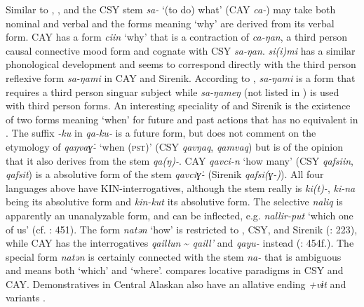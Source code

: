 Similar to , , and  the CSY stem \textit{sa-} ‘(to do) what’ (CAY \textit{ca-}) may take both nominal and verbal  and the forms meaning ‘why’ are derived from its verbal form. CAY has a form \textit{ciin} ‘why’ that is a contraction of \textit{ca-ŋan}, a third person  causal connective mood form and cognate with CSY \textit{sa-ŋan}.   \textit{si(i)mi} has a similar phonological development and seems to correspond directly with the third person reflexive form \textit{sa-ŋami} in CAY and Sirenik. According to \citet{Jacobson2001}, \textit{sa-ŋami} is a form that requires a third person singuar subject while \textit{sa-ŋameŋ} (not listed in ) is used with third person  forms. An interesting speciality of  and Sirenik is the existence of two forms meaning ‘when’ for future and past actions that has no equivalent in . The suffix \textit{-ku} in \textit{qa-ku-} is a future form, but \cite[452f.]{Miyaoka2012} does not comment on the etymology of \textit{qaŋva\.{ɣ}}\textit{-} ‘when (\textsc{pst})’ (CSY \textit{qavŋaq},   \textit{qamvaq}) but is of the opinion that it also derives from the stem \textit{qa(ŋ)-}. CAY \textit{qavci-n} ‘how many’ (CSY \textit{qafsiin},   \textit{qafsit}) is a  absolutive form of the stem \textit{qavci\.{ɣ}}\textit{-} (Sirenik \textit{qafsi(ɣ-)}). All four languages above have KIN-interrogatives, although the stem really is \textit{ki(t)-}, \textit{ki-na} being its  absolutive form and \textit{kin-kut} its  absolutive form. The selective  \textit{naliq} is apparently an unanalyzable form, and can be inflected, e.g. \textit{nallir-put} ‘which one of us’ (cf. \citealt{Miyaoka2012}: 451). The form \textit{natən} ‘how’ is restricted to  , CSY, and Sirenik (\citealt{FortescueJacobsonKaplan2010}: 223), while CAY has the interrogatives \textit{qaillun} {\textasciitilde} \textit{qaill’} and \textit{qayu-} instead (\citealt{Miyaoka2012}: 454f.). The special form \textit{natən} is certainly connected with the stem \textit{na-} that is ambiguous and means both ‘which’ and ‘where’.  compares locative  paradigms in CSY and CAY. Demonstratives in Central Alaskan  also have an allative ending \textit{+vɨt} and variants \citep[769]{Miyaoka2012}.

